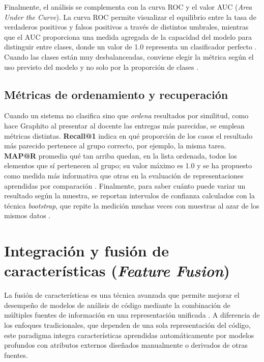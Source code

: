 Finalmente, el análisis se complementa con la curva ROC y el valor AUC (\textit{Area Under the Curve}). La curva ROC permite visualizar el equilibrio entre la tasa de verdaderos positivos y falsos positivos a través de distintos umbrales, mientras que el AUC proporciona una medida agregada de la capacidad del modelo para distinguir entre clases, donde un valor de 1.0 representa un clasificador perfecto \cite{Hanley1982ROC}. Cuando las clases están muy desbalanceadas, conviene elegir la métrica según el uso previsto del modelo y no solo por la proporción de clases \cite{McDermott2024AUROC}.

\subsection{Métricas de ordenamiento y recuperación}

Cuando un sistema no clasifica sino que \emph{ordena} resultados por similitud, como hace Graphito al presentar al docente las entregas más parecidas, se emplean métricas distintas. \textbf{Recall@1} indica en qué proporción de los casos el resultado más parecido pertenece al grupo correcto, por ejemplo, la misma tarea. \textbf{MAP@R} promedia qué tan arriba quedan, en la lista ordenada, todos los elementos que sí pertenecen al grupo; su valor máximo es 1.0 y se ha propuesto como medida más informativa que otras en la evaluación de representaciones aprendidas por comparación \cite{Musgrave2020Reality}. Finalmente, para saber cuánto puede variar un resultado según la muestra, se reportan intervalos de confianza calculados con la técnica \textit{bootstrap}, que repite la medición muchas veces con muestras al azar de los mismos datos \cite{Efron1993Bootstrap}.

\section{Integración y fusión de características (\textit{Feature Fusion})}

La fusión de características es una técnica avanzada que permite mejorar el desempeño de modelos de análisis de código mediante la combinación de múltiples fuentes de información en una representación unificada \cite{MartinezGil2026Improving}. A diferencia de los enfoques tradicionales, que dependen de una sola representación del código, este paradigma integra características aprendidas automáticamente por modelos profundos con atributos externos diseñados manualmente o derivados de otras fuentes.

